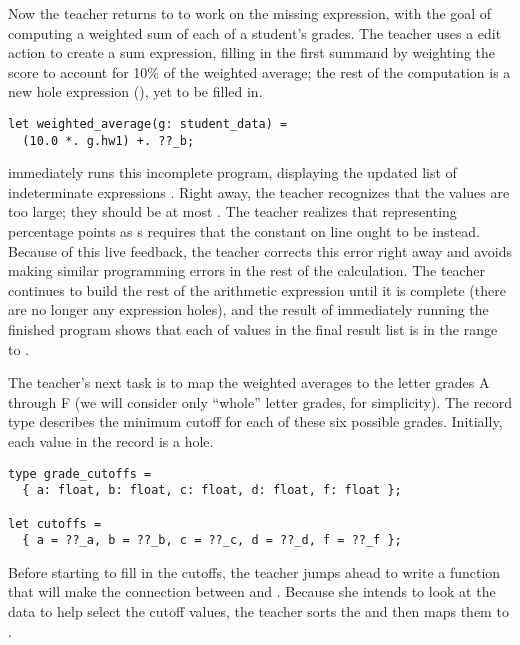 Now the teacher returns to  to work on the missing
expression, with the goal of computing a weighted sum of each of a student's
grades.
%
The teacher uses a \HazelnutLive{} edit action to create a sum expression,
filling in the first summand by weighting the  score to account for 10\%
of the weighted average; the rest of the computation is a new hole expression
(), yet to be filled in.

\begin{lstlisting}
let weighted_average(g: student_data) =
  (10.0 *. g.hw1) +. ??_b;
\end{lstlisting}

\noindent
%
\HazelnutLive{} immediately runs this incomplete program, displaying the updated
list of indeterminate expressions \li{[760.0 + ??_b.1, 880.0 + ??_b.2, ...]}.
%
Right away, the teacher recognizes that the values are too large; they should be
at most .
%
The teacher realizes that representing percentage points as s requires
that the constant on line  ought to be  instead.
%
Because of this live feedback, the teacher corrects this error right away and
avoids making similar programming errors in the rest of the calculation.
%
The teacher continues to build the rest of the arithmetic expression until it is
complete (there are no longer any expression holes), and the result of
immediately running the finished program shows that each of values in the final
result list is in the range  to .

%
The teacher's next task is to map the weighted averages to the letter grades A
through F (we will consider only ``whole'' letter grades, for simplicity).
%
The  record type describes the minimum cutoff for each of
these six possible grades.
%
Initially, each value in the  record is a hole.

\begin{lstlisting}
type grade_cutoffs =
  { a: float, b: float, c: float, d: float, f: float };

let cutoffs =
  { a = ??_a, b = ??_b, c = ??_c, d = ??_d, f = ??_f };
\end{lstlisting}

\noindent
%
%
Before starting to fill in the cutoffs, the teacher jumps ahead to write a
function  that will make the connection between 
and .
%
Because she intends to look at the data to help select the cutoff values, the
teacher sorts the  and then maps them to
.

